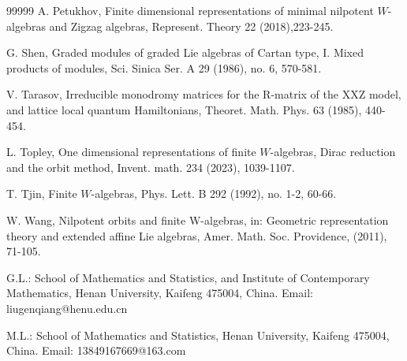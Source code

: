 \documentclass[12pt,a4paper]{amsart}
\numberwithin{equation}{section}
\begin{document}
\begin{thebibliography}{99999}
  A. Petukhov, Finite dimensional representations of minimal nilpotent $W$-algebras and Zigzag algebras, Represent. Theory 22 (2018),223-245.

 G. Shen, Graded modules of graded Lie algebras of
Cartan type, I. Mixed products of modules,  Sci. Sinica Ser. A
29  (1986),  no. 6, 570-581.


 V. Tarasov, Irreducible monodromy matrices for the R-matrix of the XXZ model, and
lattice local quantum Hamiltonians, Theoret. Math. Phys. 63 (1985), 440-454.

 L. Topley, One dimensional representations of finite $W$-algebras, Dirac reduction and the orbit method, Invent. math. 234 (2023), 1039-1107.

    T. Tjin, Finite $W$-algebras, Phys. Lett. B 292  (1992), no. 1-2, 60-66.


     W. Wang, Nilpotent orbits and finite W-algebras, in: Geometric representation theory and extended affine Lie algebras, Amer. Math. Soc. Providence, (2011), 71-105.

\end{thebibliography}





\vspace{4mm}

 \noindent G.L.: School of Mathematics and Statistics,
and  Institute of Contemporary Mathematics,
Henan University, Kaifeng 475004, China. Email: liugenqiang@henu.edu.cn


\vspace{0.2cm}


 \noindent M.L.: School of Mathematics and Statistics,
Henan University, Kaifeng 475004, China. Email: 13849167669@163.com
\end{document}
